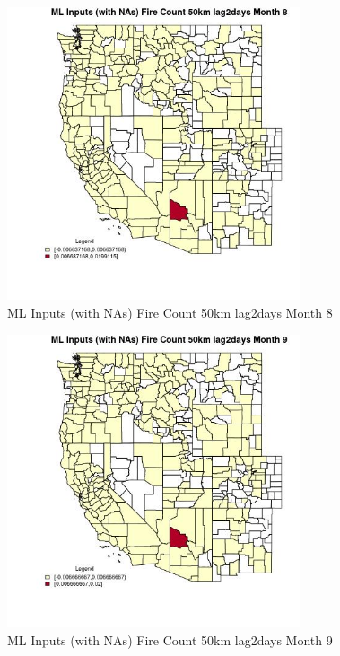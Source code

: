 \begin{figure} 
\centering  
\includegraphics[width=0.77\textwidth]{Code_Outputs/Report_ML_input_PM25_Step4_part_e_de_duplicated_aves_compiled_2019-05-21wNAs_CountyFire_Count_50km_lag2daysmedianMonth8.jpg} 
\caption{\label{fig:Report_ML_input_PM25_Step4_part_e_de_duplicated_aves_compiled_2019-05-21wNAsCountyFire_Count_50km_lag2daysmedianMonth8}ML Inputs (with NAs) Fire Count 50km lag2days Month 8} 
\end{figure} 
 

\begin{figure} 
\centering  
\includegraphics[width=0.77\textwidth]{Code_Outputs/Report_ML_input_PM25_Step4_part_e_de_duplicated_aves_compiled_2019-05-21wNAs_CountyFire_Count_50km_lag2daysmedianMonth9.jpg} 
\caption{\label{fig:Report_ML_input_PM25_Step4_part_e_de_duplicated_aves_compiled_2019-05-21wNAsCountyFire_Count_50km_lag2daysmedianMonth9}ML Inputs (with NAs) Fire Count 50km lag2days Month 9} 
\end{figure} 
 

